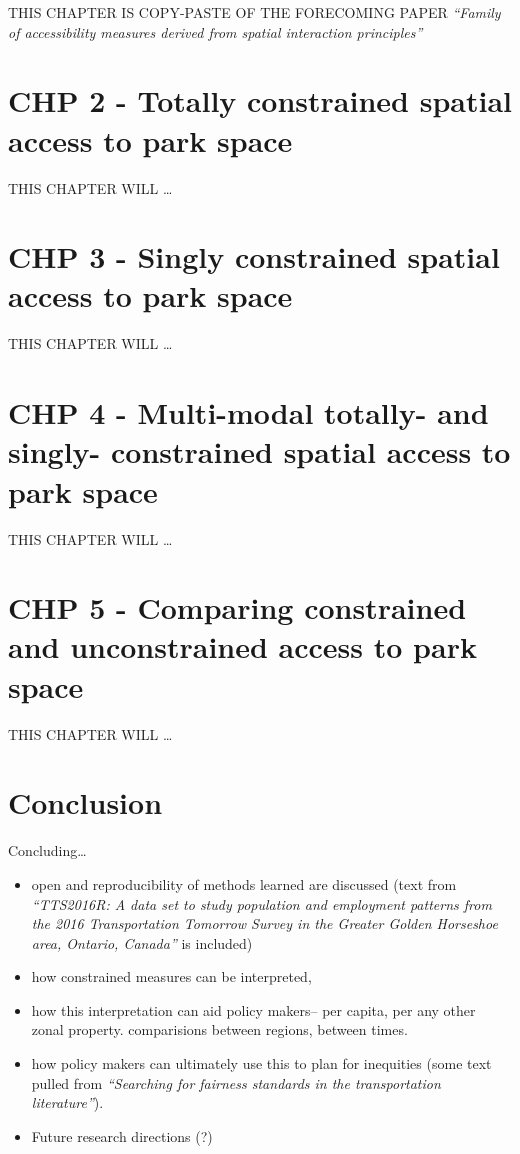 \documentclass[
11pt, %
oneside, %
english, %
singlespacing, %
]{macthesis} %
\def\tightlist{}
\begin{document}
THIS CHAPTER IS COPY-PASTE OF THE FORECOMING PAPER \emph{``Family of accessibility measures derived from spatial interaction principles''}

\chapter{CHP 2 - Totally constrained spatial access to park space}\label{chp-2---totally-constrained-spatial-access-to-park-space}

THIS CHAPTER WILL \ldots{}

\chapter{CHP 3 - Singly constrained spatial access to park space}\label{chp-3---singly-constrained-spatial-access-to-park-space}

THIS CHAPTER WILL \ldots{}

\chapter{CHP 4 - Multi-modal totally- and singly- constrained spatial access to park space}\label{chp-4---multi-modal-totally--and-singly--constrained-spatial-access-to-park-space}

THIS CHAPTER WILL \ldots{}

\chapter{CHP 5 - Comparing constrained and unconstrained access to park space}\label{chp-5---comparing-constrained-and-unconstrained-access-to-park-space}

THIS CHAPTER WILL \ldots{}

\chapter*{Conclusion}\label{conclusion}

Concluding\ldots{}

\begin{itemize}
\tightlist
\item
  open and reproducibility of methods learned are discussed (text from \emph{``TTS2016R: A data set to study population and employment patterns from the 2016 Transportation Tomorrow Survey in the Greater Golden Horseshoe area, Ontario, Canada''} is included)
\item
  how constrained measures can be interpreted,
\item
  how this interpretation can aid policy makers-- per capita, per any other zonal property. comparisions between regions, between times.
\item
  how policy makers can ultimately use this to plan for inequities (some text pulled from \emph{``Searching for fairness standards in the transportation literature''}).
\item
  Future research directions (?)
\end{itemize}
\end{document}
